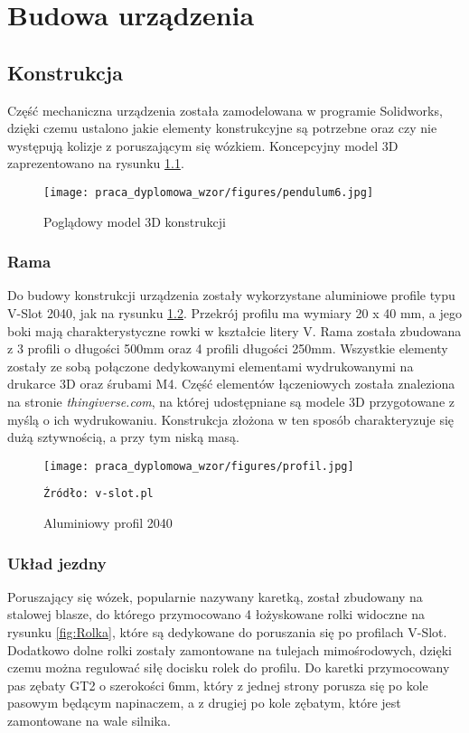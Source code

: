 \chapter{Budowa urządzenia}

\section{Konstrukcja}

Część mechaniczna urządzenia została zamodelowana w programie Solidworks, dzięki czemu ustalono jakie elementy konstrukcyjne są potrzebne oraz czy nie występują kolizje z poruszającym się wózkiem. Koncepcyjny model 3D zaprezentowano na rysunku \ref{fig:konstrukcja}. 

\begin{figure}
    \centering
    \texttt{[image: praca\_dyplomowa\_wzor/figures/pendulum6.jpg]}
    \caption{Poglądowy model 3D konstrukcji}
    \label{fig:konstrukcja}
\end{figure}

\subsection{Rama}
Do budowy konstrukcji urządzenia zostały wykorzystane aluminiowe profile typu V-Slot 2040, jak na rysunku \ref{fig:profil}. Przekrój profilu ma wymiary 20 x 40 mm, a jego boki mają charakterystyczne rowki w kształcie litery V. Rama została zbudowana z 3 profili o długości 500mm oraz 4 profili długości 250mm. Wszystkie elementy zostały ze sobą połączone dedykowanymi elementami wydrukowanymi na drukarce 3D oraz śrubami M4. Część elementów łączeniowych została znaleziona na stronie \textit{thingiverse.com}, na której udostępniane są modele 3D przygotowane z myślą o ich wydrukowaniu. Konstrukcja złożona w ten sposób charakteryzuje się dużą sztywnością, a przy tym niską masą.

\begin{figure}
    \centering
    \texttt{[image: praca\_dyplomowa\_wzor/figures/profil.jpg]}
    \caption{Aluminiowy profil 2040}
    \texttt{Źródło: v-slot.pl}
    \label{fig:profil}
\end{figure}

\subsection{Układ jezdny}
Poruszający się wózek, popularnie nazywany karetką, został zbudowany na stalowej blasze, do którego przymocowano 4 łożyskowane rolki widoczne na rysunku \ref{fig:Rolka}, które są dedykowane do poruszania się po profilach V-Slot. Dodatkowo dolne rolki zostały zamontowane na tulejach mimośrodowych, dzięki czemu można regulować siłę docisku rolek do profilu. Do karetki przymocowany pas zębaty GT2 o szerokości 6mm, który z jednej strony porusza się po kole pasowym będącym napinaczem, a z drugiej po kole zębatym, które jest zamontowane na wale silnika. 


